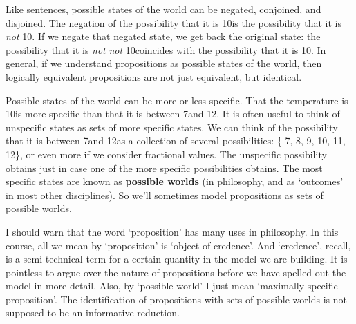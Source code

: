 Like sentences, possible states of the world can be negated,
conjoined, and disjoined. The negation of the possibility that it is
10\celsius is the possibility that it is \emph{not} 10\celsius. If we
negate that negated state, we get back the original state: the
possibility that it is \emph{not} \emph{not} 10\celsius coincides with
the possibility that it is 10\celsius. In general, if we understand
propositions as possible states of the world, then logically
equivalent propositions are not just equivalent, but identical.


Possible states of the world can be more or less specific. That the temperature
is 10\celsius is more specific than that it is between 7\celsius and 12\celsius.
It is often useful to think of unspecific states as sets of more specific
states. We can think of the possibility that it is between 7\celsius and
12\celsius as a collection of several possibilities: \{ 7\celsius, 8\celsius,
9\celsius, 10\celsius, 11\celsius, 12\celsius \}, or even more if we consider
fractional values. The unspecific possibility obtains just in case one of the
more specific possibilities obtains. The most specific states are known as
\textbf{possible worlds} (in philosophy, and as `outcomes' in most other
disciplines). So we'll sometimes model propositions as sets of possible worlds.

I should warn that the word `proposition' has many uses in
philosophy. In this course, all we mean by `proposition' is `object of
credence'. And `credence', recall, is a semi-technical term for a
certain quantity in the model we are building. It is pointless to
argue over the nature of propositions before we have spelled out the
model in more detail. Also, by `possible world' I just mean `maximally
specific proposition'. The identification of propositions with sets of
possible worlds is not supposed to be an informative reduction.

